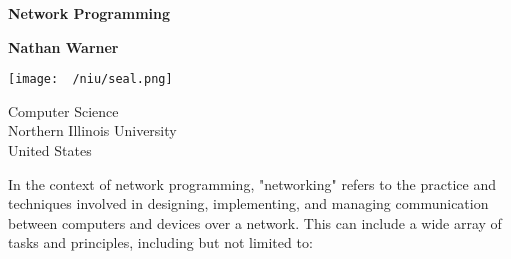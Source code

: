 \documentclass{report}
\title{\Huge{}}
\author{\huge{Nathan Warner}}
\date{\huge{}}
\begin{document}
        \begin{titlepage}
       \begin{center}
           \vspace*{1cm}
    
           \textbf{Network Programming}
    
           \vspace{0.5cm}
            
                
           \vspace{1.5cm}
    
           \textbf{Nathan Warner}
    
           \vfill
                
                
           \vspace{0.8cm}
         
           \texttt{[image: ~/niu/seal.png]}
                
           Computer Science \\
           Northern Illinois University\\
           United States\\
           
                
       \end{center}
    \end{titlepage}
    \tableofcontents
    \pagebreak 
        \pagebreak 
    \bigbreak \noindent 
    \bigbreak \noindent 
    In the context of network programming, "networking" refers to the practice and techniques involved in designing, implementing, and managing communication between computers and devices over a network. This can include a wide array of tasks and principles, including but not limited to:
\end{document}
